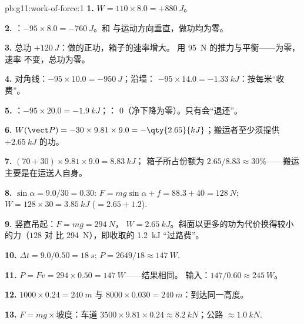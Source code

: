 \begin{solution}{pb:g11:work-of-force:1}
\textbf{1.} $W = 110 \times 8.0 = +\qty{880}{J}$。

\textbf{2.} ：$-95 \times 8.0 = -\qty{760}{J}$。和
与运动方向垂直，做功均为零。

\textbf{3.} 总功 $+\qty{120}{J}$：做的正功，箱子的速率增大。
用 \qty{95}{N} 的推力与平衡——为零，速率
不变，总功为零。

\textbf{4.} 对角线：$-95 \times 10.0 = -\qty{950}{J}$；沿墙：
$-95 \times 14.0 = -\qty{1.33}{kJ}$：按每米“收费”。

\textbf{5.} ：$-95 \times 20.0 = -\qty{1.9}{kJ}$；：
$0$（净下降为零）。只有会“退还”。

\textbf{6.} $W(\vect P) = -30 \times 9.81 \times 9.0 =
-\qty{2.65}{kJ}$；搬运者至少须提供 $+\qty{2.65}{kJ}$ 的功。

\textbf{7.} $(70 + 30) \times 9.81 \times 9.0 = \qty{8.83}{kJ}$；
箱子所占份额为 $2.65/8.83 \approx 30\%$——搬运
主要是在运送人自身。

\textbf{8.} $\sin\alpha = 9.0/30 = 0.30$:
$F = mg\sin\alpha + f = 88.3 + 40 = \qty{128}{N}$;
$W = 128 \times 30 = \qty{3.85}{kJ}$ ($= 2.65 + 1.2$).

\textbf{9.} 竖直吊起：$F = mg = \qty{294}{N}$，
$W = \qty{2.65}{kJ}$。斜面以更多的功为代价换得较小的力（$128$ 对
比 \qty{294}{N}），即收取的 \qty{1.2}{kJ}
“过路费”。

\textbf{10.} $\Delta t = 9.0/0.50 = \qty{18}{s}$;
$P = 2649/18 \approx \qty{147}{W}$.

\textbf{11.} $P = Fv = 294 \times 0.50 = \qty{147}{W}$——结果相同。
输入：$147/0.60 \approx \qty{245}{W}$。

\textbf{12.} $1000 \times 0.24 = \qty{240}{m}$ 与
$8000 \times 0.030 = \qty{240}{m}$：到达同一高度。

\textbf{13.} $F = mg \times \text{坡度}$：车道
$3500 \times 9.81 \times 0.24 \approx \qty{8.2}{kN}$；公路
$\approx \qty{1.0}{kN}$.


\end{solution}
